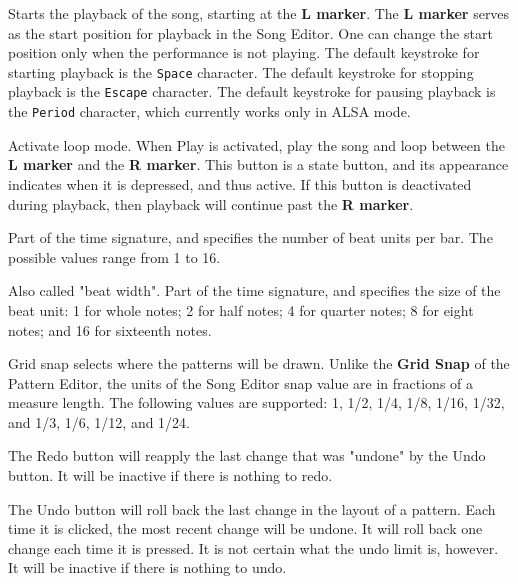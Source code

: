    Starts the playback of the song, starting at the \textbf{L marker}.
   The \textbf{L marker} serves as the start position for playback
   in the Song Editor.  One can change the start position only when the
   performance is not playing.
   The default keystroke for starting playback is the \texttt{Space} character.
   The default keystroke for stopping playback is the \texttt{Escape} character.
   The default keystroke for pausing playback is the \texttt{Period} character,
   which currently works only in ALSA mode.

   Activate loop mode. When Play is activated,  play the song and loop
   between the
   \textbf{L marker} and the \textbf{R marker}.
   This button is a state button, and its appearance indicates when it is
   depressed, and thus active.
   If this button is deactivated during playback, then playback will
   continue past the \textbf{R marker}.

   Part of the time signature, and specifies the number of beat units per bar.
   The possible values range from 1 to 16.

   Also called "beat width".
   Part of the time signature, and specifies the size of the beat unit:
   1 for whole notes; 2 for half notes; 4 for quarter notes; 8 for eight notes;
   and 16 for sixteenth notes.

   Grid snap selects where the patterns will be drawn.
   Unlike the \textbf{Grid Snap} of the Pattern Editor, the units
   of the Song Editor snap value are in fractions of a measure length.
   The following values are supported:
   1, 1/2, 1/4, 1/8, 1/16, 1/32, and 1/3, 1/6, 1/12, and 1/24.

   The Redo button will reapply the last change that was "undone" by
   the Undo button.
   It will be inactive if there is nothing to redo.

   The Undo button will roll back the last change in the layout of a
   pattern.  Each time it is clicked, the most recent change will be undone.
   It will roll back one change each time it is pressed.
   It is not certain what the undo limit is, however.
   It will be inactive if there is nothing to undo.

